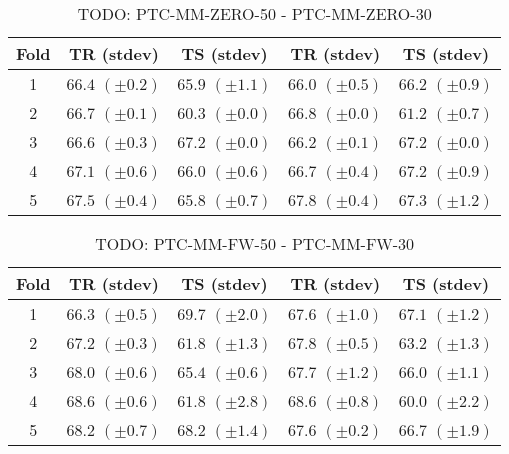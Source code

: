 \documentclass[10pt,a4paper]{book}
\begin{document}
\begin{table}[tbph]
\caption{TODO: PTC-MM-ZERO-50 - PTC-MM-ZERO-30}
\label{TODO}
\centering
\begin{tabular}{c*{4}{c}}
\toprule
Fold & TR (stdev) & TS (stdev) & TR (stdev) & TS (stdev)\\
\midrule
1 & $66.4$ $(\pm 0.2)$ & $65.9$ $(\pm 1.1)$ & $66.0$ $(\pm 0.5)$ & $66.2$ $(\pm 0.9)$\\
2 & $66.7$ $(\pm 0.1)$ & $60.3$ $(\pm 0.0)$ & $66.8$ $(\pm 0.0)$ & $61.2$ $(\pm 0.7)$\\
3 & $66.6$ $(\pm 0.3)$ & $67.2$ $(\pm 0.0)$ & $66.2$ $(\pm 0.1)$ & $67.2$ $(\pm 0.0)$\\
4 & $67.1$ $(\pm 0.6)$ & $66.0$ $(\pm 0.6)$ & $66.7$ $(\pm 0.4)$ & $67.2$ $(\pm 0.9)$\\
5 & $67.5$ $(\pm 0.4)$ & $65.8$ $(\pm 0.7)$ & $67.8$ $(\pm 0.4)$ & $67.3$ $(\pm 1.2)$\\
\bottomrule
\end{tabular}
\end{table}


\clearpage 



\begin{table}[tbph]
\caption{TODO: PTC-MM-FW-50 - PTC-MM-FW-30}
\label{TODO}
\centering
\begin{tabular}{c*{4}{c}}
\toprule
Fold & TR (stdev) & TS (stdev) & TR (stdev) & TS (stdev)\\
\midrule
1 & $66.3$ $(\pm 0.5)$ & $69.7$ $(\pm 2.0)$ & $67.6$ $(\pm 1.0)$ & $67.1$ $(\pm 1.2)$\\
2 & $67.2$ $(\pm 0.3)$ & $61.8$ $(\pm 1.3)$ & $67.8$ $(\pm 0.5)$ & $63.2$ $(\pm 1.3)$\\
3 & $68.0$ $(\pm 0.6)$ & $65.4$ $(\pm 0.6)$ & $67.7$ $(\pm 1.2)$ & $66.0$ $(\pm 1.1)$\\
4 & $68.6$ $(\pm 0.6)$ & $61.8$ $(\pm 2.8)$ & $68.6$ $(\pm 0.8)$ & $60.0$ $(\pm 2.2)$\\
5 & $68.2$ $(\pm 0.7)$ & $68.2$ $(\pm 1.4)$ & $67.6$ $(\pm 0.2)$ & $66.7$ $(\pm 1.9)$\\
\bottomrule
\end{tabular}
\end{table}


\end{document}
